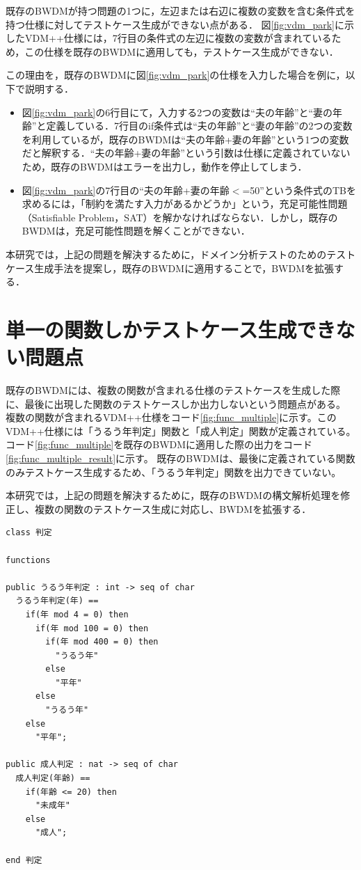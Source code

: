 \documentclass[uplatex, report, a4j, 10pt]{jsbook}
\newcommand{\tool}{BWDM}
\begin{document}
既存のBWDMが持つ問題の1つに，左辺または右辺に複数の変数を含む条件式を持つ仕様に対してテストケース生成ができない点がある．
図\ref{fig:vdm_park}に示したVDM++仕様には，7行目の条件式の左辺に複数の変数が含まれているため，この仕様を既存のBWDMに適用しても，テストケース生成ができない．

この理由を，既存のBWDMに図\ref{fig:vdm_park}の仕様を入力した場合を例に，以下で説明する．

\begin{itemize}
  \item 図\ref{fig:vdm_park}の6行目にて，入力する2つの変数は“夫の年齢”と“妻の年齢”と定義している．7行目のif条件式は“夫の年齢”と“妻の年齢”の2つの変数を利用しているが，既存のBWDMは“夫の年齢+妻の年齢”という1つの変数だと解釈する．“夫の年齢+妻の年齢”という引数は仕様に定義されていないため，既存のBWDMはエラーを出力し，動作を停止してしまう．
  \item 図\ref{fig:vdm_park}の7行目の“夫の年齢+妻の年齢$<$=50”という条件式のTBを求めるには，「制約を満たす入力があるかどうか」という，充足可能性問題（Satisfiable Problem，SAT）を解かなければならない．しかし，既存のBWDMは，充足可能性問題を解くことができない．
\end{itemize}

本研究では，上記の問題を解決するために，ドメイン分析テストのためのテストケース生成手法を提案し，既存のBWDMに適用することで，BWDMを拡張する．

\section{単一の関数しかテストケース生成できない問題点}\label{sec:probrem_only_function}
既存の\tool{}には、複数の関数が含まれる仕様のテストケースを生成した際に、最後に出現した関数のテストケースしか出力しないという問題点がある。
複数の関数が含まれるVDM++仕様をコード\ref{fig:func_multiple}に示す。このVDM++仕様には「うるう年判定」関数と「成人判定」関数が定義されている。
コード\ref{fig:func_multiple}を既存のBWDMに適用した際の出力をコード\ref{fig:func_multiple_result}に示す。
既存のBWDMは、最後に定義されている関数のみテストケース生成するため、「うるう年判定」関数を出力できていない。

本研究では，上記の問題を解決するために，既存の\tool{}の構文解析処理を修正し、複数の関数のテストケース生成に対応し、\tool{}を拡張する．

\lstset{language=}
\noindent\begin{minipage}{\textwidth}
\begin{lstlisting}[caption=複数の関数が含まれるVDM++仕様。,label=fig:func_multiple]
class 判定

functions

public うるう年判定 : int -> seq of char
  うるう年判定(年) ==
    if(年 mod 4 = 0) then
      if(年 mod 100 = 0) then
        if(年 mod 400 = 0) then
          "うるう年"
        else
          "平年"
      else
        "うるう年"
    else
      "平年";

public 成人判定 : nat -> seq of char
  成人判定(年齢) ==
    if(年齢 <= 20) then
      "未成年"
    else
      "成人";

end 判定
\end{lstlisting}
\end{minipage}
\end{document}
